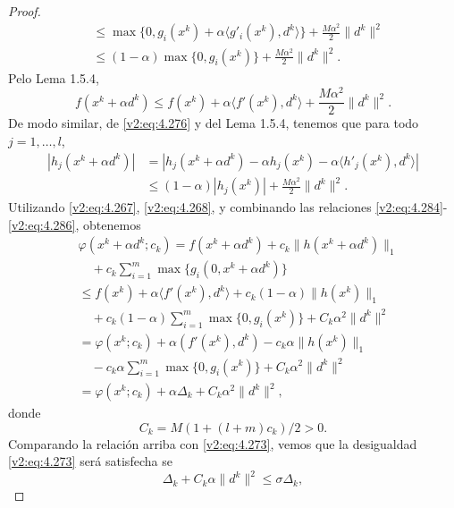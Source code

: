 \begin{proof}
\begin{align}
        &\le \max\{0, g_i(x^k) + \alpha \langle g'_i(x^k), d^k \rangle\} + \frac{M\alpha^2}{2}\|d^k\|^2 \nonumber \\
        &\le (1 - \alpha) \max\{0, g_i(x^k)\} + \frac{M\alpha^2}{2}\|d^k\|^2.
        \label{v2:eq:4.284}
    \end{align}
    Pelo Lema 1.5.4,
    \begin{equation}
        f(x^k + \alpha d^k) \le f(x^k) + \alpha \langle f'(x^k), d^k \rangle + \frac{M\alpha^2}{2}\|d^k\|^2.
        \label{v2:eq:4.285}
    \end{equation}
    De modo similar, de \eqref{v2:eq:4.276} y del Lema 1.5.4, tenemos que para todo $j = 1, \dots, l$,
    \begin{align}
        |h_j(x^k + \alpha d^k)| &= |h_j(x^k + \alpha d^k) - \alpha h_j(x^k) - \alpha \langle h'_j(x^k), d^k \rangle| \nonumber \\
        &\le (1 - \alpha)|h_j(x^k)| + \frac{M\alpha^2}{2}\|d^k\|^2.
        \label{v2:eq:4.286}
    \end{align}
    Utilizando \eqref{v2:eq:4.267}, \eqref{v2:eq:4.268}, y combinando las relaciones \eqref{v2:eq:4.284}-\eqref{v2:eq:4.286}, obtenemos
    \begin{align}
        &\varphi(x^k + \alpha d^k; c_k) = f(x^k + \alpha d^k) + c_k \|h(x^k + \alpha d^k)\|_1 \nonumber \\
        &\quad + c_k \sum_{i=1}^m \max\{g_i(0, x^k + \alpha d^k)\} \nonumber \\
        &\le f(x^k) + \alpha \langle f'(x^k), d^k \rangle + c_k(1 - \alpha)\|h(x^k)\|_1 \nonumber \\
        &\quad + c_k(1 - \alpha)\sum_{i=1}^m \max\{0, g_i(x^k)\} + C_k\alpha^2\|d^k\|^2 \nonumber \\
        &= \varphi(x^k; c_k) + \alpha(f'(x^k), d^k) - c_k\alpha\|h(x^k)\|_1 \nonumber \\
        &\quad - c_k\alpha\sum_{i=1}^m \max\{0, g_i(x^k)\} + C_k\alpha^2\|d^k\|^2 \nonumber \\
        &= \varphi(x^k; c_k) + \alpha\Delta_k + C_k\alpha^2\|d^k\|^2,
    \end{align}
    donde
    \begin{equation}
        C_k = M(1 + (l + m)c_k)/2 > 0.
        \label{v2:eq:4.287}
    \end{equation}
    Comparando la relación arriba con \eqref{v2:eq:4.273}, vemos que la desigualdad \eqref{v2:eq:4.273} será satisfecha se
    \[
        \Delta_k + C_k\alpha\|d^k\|^2 \le \sigma\Delta_k,
    \]

\end{proof}
